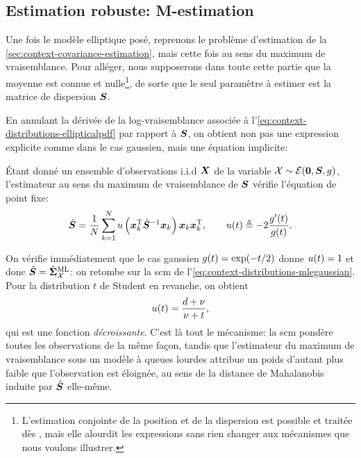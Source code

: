 \subsection{Estimation robuste: M-estimation}
\label{subsec:context-robust-m-estimation}

Une fois le modèle elliptique posé, reprenons le problème d'estimation de la \cref{sec:context-covariance-estimation}, mais cette fois au sens du maximum de vraisemblance. Pour alléger, nous supposerons dans toute cette partie que la moyenne est connue et nulle\footnote{L'estimation conjointe de la position et de la dispersion est possible et traitée dès \cite{Maronna76}, mais elle alourdit les expressions sans rien changer aux mécanismes que nous voulons illustrer.}, de sorte que le seul paramètre à estimer est la matrice de dispersion $\boldsymbol{S}$.

En annulant la dérivée de la log-vraisemblance associée à l'\cref{eq:context-distributions-ellipticalpdf} par rapport à $\boldsymbol{S}$, on obtient non pas une expression explicite comme dans le cas gaussien, mais une équation implicite:

\begin{proposition}
\label{prop:context-robust-mlelliptical}
  \'Etant donné un ensemble d'observations i.i.d $\boldsymbol{X}$ de la variable $\mathcal{X}\sim\mathcal{E}(\boldsymbol{0},\boldsymbol{S},g)$, l'estimateur au sens du maximum de vraisemblance de $\boldsymbol{S}$ vérifie l'équation de point fixe:
\begin{equation}
  \hat{\boldsymbol{S}}
  =
  \frac{1}{N}\sum_{k=1}^{N}
  u\left(\boldsymbol{x}_k^{\mathrm{T}} {\hat{\boldsymbol{S}}}^{-1} \boldsymbol{x}_k\right)
  \boldsymbol{x}_k\boldsymbol{x}_k^{\mathrm{T}},
  \qquad
  u(t) \triangleq -2\frac{g'(t)}{g(t)}.
  \label{eq:context-robust-fixedpoint}
\end{equation}
\end{proposition}

\begin{remark}
  On vérifie immédiatement que le cas gaussien $g(t)=\exp(-t/2)$ donne $u(t)=1$ et donc $\hat{\boldsymbol{S}}=\hat{\boldsymbol{\Sigma}}_{\mathcal{X}}^{\mathrm{ML}}$: on retombe sur la scm de l'\cref{eq:context-distributions-mlegaussian}. Pour la distribution $t$ de Student en revanche, on obtient
  $$
  u(t) = \frac{d+\nu}{\nu+t},
  $$
  qui est une fonction \emph{décroissante}. C'est là tout le mécanisme: la scm pondère toutes les observations de la même façon, tandis que l'estimateur du maximum de vraisemblance sous un modèle à queues lourdes attribue un poids d'autant plus faible que l'observation est éloignée, au sens de la distance de Mahalanobis induite par $\hat{\boldsymbol{S}}$ elle-même.
\end{remark}

